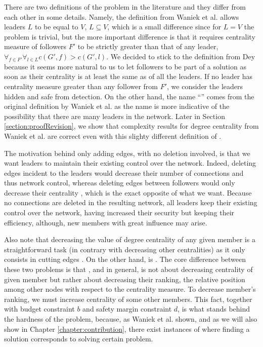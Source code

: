 There are two definitions of the \HL problem in the literature and they differ from each other in some details.
Namely, the definition from Waniek et al. \cite{Waniek2017} allows leaders $L$ to be equal to $V$, $L \subseteq V$,
which is a small difference since for $L = V$ the problem is trivial, but the more important difference is that
it requires centrality measure of followers $F'$ to be strictly greater than that of any leader,
$\forall_{f \in F'} \forall_{l \in L} c(G', f) > c(G', l)$.
We decided to stick to the definition from Dey \cite{Dey2019} because it seems more natural to us to let followers
to be part of a solution as soon as their centrality is at least the same as of all the leaders.
If no leader has centrality measure greater than any follower from $F'$,
we consider the leaders hidden and safe from detection.
On the other hand, the name ``\HL'' comes from the original definition by Waniek et al. as
the name is more indicative of the possibility that there are many leaders in the network.
Later in Section \ref{section:proofRevision}, we show that complexity results for degree centrality from Waniek et al.
are correct even with this slighty different definition of \HLshort.

The motivation behind only adding edges, with no deletion involved, is that we want leaders to maintain
their existing control over the network.
Indeed, deleting edges incident to the leaders would decrease their number of connections and thus network control,
whereas deleting edges between followers would only decrease their centrality ,
which is the exact opposite of what we want.
Because no connections are deleted in the resulting network, all leaders keep their existing control over the network,
having increased their security but keeping their efficiency, although, new members with great influence may arise.

Also note that decreasing the value of degree centrality of any given member is a straightforward task
(in contrary with decreasing other centralities) as it only consists in cutting edges \cite{Waniek2016}.
On the other hand, \HLdeg is \NPc \cite{Waniek2017}.
The core difference between these two problems is that \HLdeg, and \HLshort in general,
is not about decreasing centrality of given member but rather about decreasing their ranking,
the relative position among other nodes with respect to the centrality measure.
To decrease member's ranking, we must increase centrality of some other members.
This fact, together with budget constraint $b$ and safety margin constraint $d$,
is what stands behind the hardness of the \HL problem, because,
as Waniek et al. \cite{Waniek2017} shown, and as we will also show in Chapter \ref{chapter:contribution},
there exist instances of \HLshort where finding a solution corresponds to solving certain \NPh problem.

